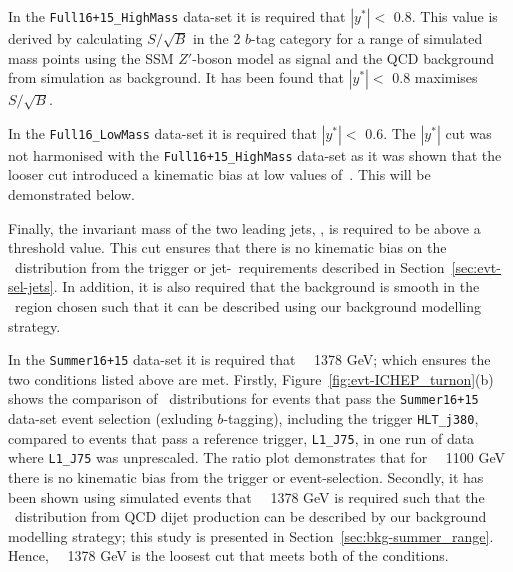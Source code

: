 In the \verb|Full16+15_HighMass| data-set it is required that $|y^*| <$ 0.8.
This value is derived by calculating $S/\sqrt{B}$ in the 2 $b$-tag category for a range of simulated mass points
using the SSM $Z'$-boson model as signal and the QCD background from simulation as background.
It has been found that $|y^*| <$ 0.8 maximises $S/\sqrt{B}$.

In the \verb|Full16_LowMass| data-set it is required that $|y^*| <$ 0.6.
The $|y^*|$ cut was not harmonised with the \verb|Full16+15_HighMass| data-set
as it was shown that the looser cut introduced a kinematic bias at low values of~\mjj.
This will be demonstrated below.

Finally, the invariant mass of the two leading jets, \mjj, is required to be above a threshold value.
This cut ensures that there is no kinematic bias on the \mjj~distribution
from the trigger or jet-\pT~requirements described in Section~\ref{sec:evt-sel-jets}.
In addition, it is also required that the background is smooth in the \mjj~region chosen
such that it can be described using our background modelling strategy.

In the \verb|Summer16+15| data-set it is required that \mjj~\gt~1378 GeV;
which ensures the two conditions listed above are met.
Firstly, Figure~\ref{fig:evt-ICHEP_turnon}(b) shows the comparison of \mjj~distributions for events
that pass the \verb|Summer16+15| data-set event selection (exluding $b$-tagging), including the trigger \verb|HLT_j380|,
compared to events that pass a reference trigger, \verb|L1_J75|,
in one run of data where \verb|L1_J75| was unprescaled.
The ratio plot demonstrates that for \mjj~\gt~1100 GeV there is no kinematic bias from the trigger or event-selection.
Secondly, it has been shown using simulated events that
\mjj~\gt~1378 GeV is required such that the \mjj~distribution from QCD dijet production
can be described by our background modelling strategy;
this study is presented in Section~\ref{sec:bkg-summer_range}.
Hence, \mjj~\gt~1378 GeV is the loosest cut that meets both of the conditions.

